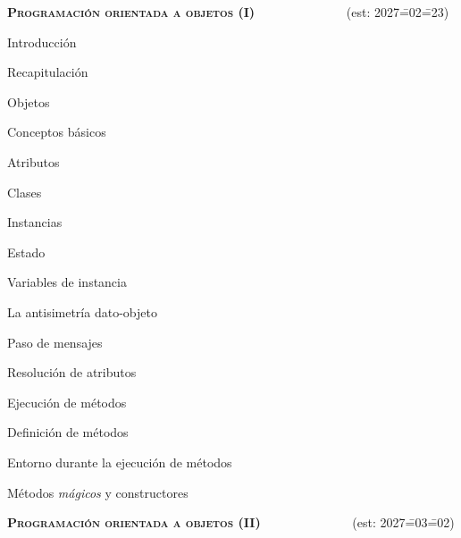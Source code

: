 \begin{longenum}
\begin{longenum}
\begin{longenum}
        \end{longenum}
    \end{longenum}
    \item \textbf{\textsc{Programación orientada a objetos (I)}} \ \ \ \ \ \ \ \ \ \ \ \ \ \ (est: 2027\==02\==23)
    \begin{longenum}
        \item Introducción
        \begin{longenum}
            \item Recapitulación
            \item Objetos
        \end{longenum}
        \item Conceptos básicos
        \begin{longenum}
            \item Atributos
            \item Clases
            \begin{longenum}
                \item Instancias
            \end{longenum}
            \item Estado
            \begin{longenum}
                \item Variables de instancia
            \end{longenum}
            \item La antisimetría dato-objeto
        \end{longenum}
        \item Paso de mensajes
        \begin{longenum}
            \item Resolución de atributos
            \item Ejecución de métodos
            \item Definición de métodos
            \begin{longenum}
                \item Entorno durante la ejecución de métodos
            \end{longenum}
            \item Métodos \textit{mágicos} y constructores
        \end{longenum}
    \end{longenum}
    \item \textbf{\textsc{Programación orientada a objetos (II)}} \ \ \ \ \ \ \ \ \ \ \ \ \ \ (est: 2027\==03\==02)

\end{longenum}
